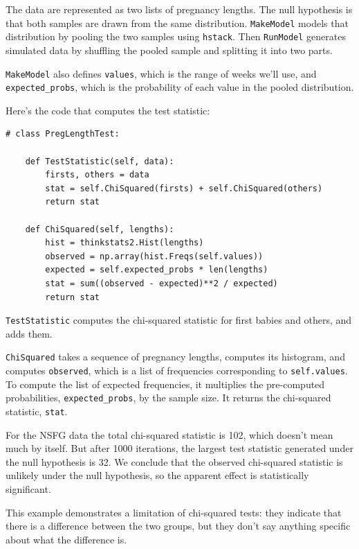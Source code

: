 \documentclass[12pt]{book}
\theoremstyle{exercise}
\begin{document}
The data are represented as two lists of pregnancy lengths.  The null
hypothesis is that both samples are drawn from the same distribution.
{\tt MakeModel} models that distribution by pooling the two
samples using {\tt hstack}.  Then {\tt RunModel} generates
simulated data by shuffling the pooled sample and splitting it
into two parts.%
%
%
%

{\tt MakeModel} also defines {\tt values}, which is the
range of weeks we'll use, and \verb"expected_probs",
which is the probability of each value in the pooled distribution.

Here's the code that computes the test statistic:

\begin{verbatim}
# class PregLengthTest:

    def TestStatistic(self, data):
        firsts, others = data
        stat = self.ChiSquared(firsts) + self.ChiSquared(others)
        return stat

    def ChiSquared(self, lengths):
        hist = thinkstats2.Hist(lengths)
        observed = np.array(hist.Freqs(self.values))
        expected = self.expected_probs * len(lengths)
        stat = sum((observed - expected)**2 / expected)
        return stat
\end{verbatim}

{\tt TestStatistic} computes the chi-squared statistic for
first babies and others, and adds them.%

{\tt ChiSquared} takes a sequence of pregnancy lengths, computes
its histogram, and computes {\tt observed}, which is a list of
frequencies corresponding to {\tt self.values}.
To compute the list of expected frequencies, it multiplies the
pre-computed probabilities, \verb"expected_probs", by the sample
size.  It returns the chi-squared statistic, {\tt stat}.

For the NSFG data the total chi-squared statistic is 102, which
doesn't mean much by itself.  But after 1000 iterations, the largest
test statistic generated under the null hypothesis is 32.  We conclude
that the observed chi-squared statistic is unlikely under the null
hypothesis, so the apparent effect is statistically significant.%
%
%

This example demonstrates a limitation of chi-squared tests: they
indicate that there is a difference between the two groups,
but they don't say anything specific about what the difference is.
\end{document}
